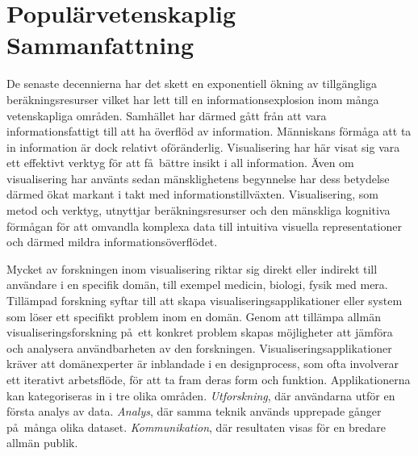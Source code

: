 \chapter*{Popul\"arvetenskaplig Sammanfattning}

De senaste decennierna har det skett en exponentiell \"okning av tillg\"angliga ber\"akningsresurser vilket har lett till en informationsexplosion inom m\aa nga vetenskapliga omr\aa den.  Samh\"allet har d\"armed g\aa tt fr\aa n att vara informationsfattigt till att ha \"overfl\"od av information.  M\"anniskans f\"orm\aa ga att ta in information \"ar dock relativt of\"or\"anderlig.  Visualisering har h\"ar visat sig vara ett effektivt verktyg f\"or att f\aa\ b\"attre insikt i all information.  \"Aven om visualisering har anv\"ants sedan m\"ansklighetens begynnelse har dess betydelse d\"armed \"okat markant i takt med informationstillv\"axten.  Visualisering, som metod och verktyg, utnyttjar ber\"akningsresurser och den m\"anskliga kognitiva f\"orm\aa gan f\"or att omvandla komplexa data till intuitiva visuella representationer och d\"armed mildra informations\"overfl\"odet.

Mycket av forskningen inom visualisering riktar sig direkt eller indirekt till anv\"andare i en specifik dom\"an, till exempel medicin, biologi, fysik med mera.  Till\"ampad forskning syftar till att skapa visualiseringsapplikationer eller system som l\"oser ett specifikt problem inom en dom\"an.  Genom att till\"ampa allm\"an visualiseringsforskning p\aa\ ett konkret problem skapas m\"ojligheter att j\"amf\"ora och analysera anv\"andbarheten av den forskningen.  Visualiseringsapplikationer kr\"aver att dom\"anexperter \"ar inblandade i en designprocess, som ofta involverar ett iterativt arbetsfl\"ode, f\"or att ta fram deras form och funktion.  Applikationerna kan kategoriseras in i tre olika omr\aa den. \emph{Utforskning}, d\"ar anv\"andarna utf\"or en f\"orsta analys av data.  \emph{Analys}, d\"ar samma teknik anv\"ands upprepade g\aa nger p\aa\ m\aa nga olika dataset.  \emph{Kommunikation}, d\"ar resultaten visas f\"or en bredare allm\"an publik.

